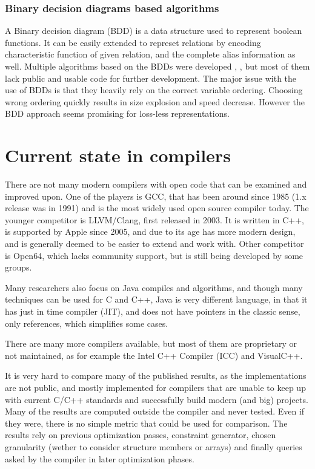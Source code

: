 \subsubsection{Binary decision diagrams based algorithms}

A Binary decision diagram (BDD) is a data structure used to represent boolean
functions. It can be easily extended to represet relations by encoding
characteristic function of given relation, and the complete alias information as
well. Multiple algorithms based on the BDDs were developed \cite{whaley2004},
\cite{bddbddb}, but most of them lack public and usable code for further
development. The major issue with the use of BDDs is that they heavily rely on
the correct variable ordering. Choosing wrong ordering quickly results in
size explosion and speed decrease. However the BDD approach seems promising for
loss-less representations.

\section{Current state in compilers}

There are not many modern compilers with open code that can be examined and improved
upon. One of the players is GCC, that has been around since 1985
(1.x release was in 1991) and is the most widely used open source compiler
today. The younger competitor is LLVM/Clang, first released in 2003. It is
written in C++, is supported by Apple since 2005, and due to its age has 
more modern design, and is generally deemed to be easier to extend and work
with. Other competitor is Open64, which lacks community support, but is still
being developed by some groups.

Many researchers also focus on Java compiles and algorithms, and though many
techniques can be used for C and C++, Java is very different language, in that
it has just in time compiler (JIT), and does not have pointers in the
classic sense, only references, which simplifies some cases.

There are many more compilers available, but most of them are proprietary or not
maintained, as for example the Intel C++ Compiler (ICC) and VisualC++.

It is very hard to compare many of the published results, as the
implementations are not public, and mostly implemented for compilers that are
unable to keep up with current C/C++ standards and successfully build modern
(and big) projects. Many of the results are computed outside the compiler and
never tested. Even if they were, there is no simple metric that could be
used for comparison. The results rely on previous optimization passes,
constraint generator, chosen granularity (wether to consider structure members or
arrays) and finally queries asked by the compiler in later optimization phases.

